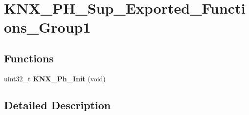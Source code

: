 \hypertarget{group___k_n_x___p_h___sup___exported___functions___group1}{}\section{K\+N\+X\+\_\+\+P\+H\+\_\+\+Sup\+\_\+\+Exported\+\_\+\+Functions\+\_\+\+Group1}
\label{group___k_n_x___p_h___sup___exported___functions___group1}
\subsection*{Functions}
\begin{DoxyCompactItemize}
\item 
uint32\+\_\+t {\bfseries K\+N\+X\+\_\+\+Ph\+\_\+\+Init} (void)\hypertarget{group___k_n_x___p_h___sup___exported___functions___group1_gac778d1760235bafd711b75b73e664595}{}\label{group___k_n_x___p_h___sup___exported___functions___group1_gac778d1760235bafd711b75b73e664595}

\end{DoxyCompactItemize}


\subsection{Detailed Description}
